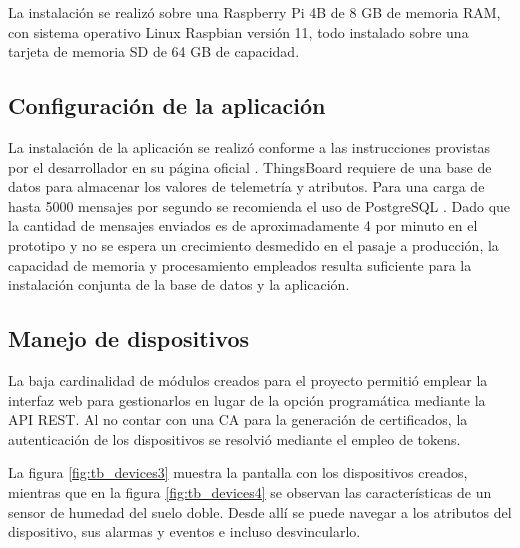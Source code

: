 La instalación se realizó sobre una Raspberry Pi 4B de 8 GB de memoria RAM, con sistema operativo Linux Raspbian versión 11, todo instalado sobre una tarjeta de memoria SD de 64 GB de capacidad.



\subsection{Configuración de la aplicación}
\label{sec:Configuración de la aplicación}

La instalación de la aplicación se realizó conforme a las instrucciones provistas por el desarrollador en su página oficial \citep{tb_install}.
ThingsBoard requiere de una base de datos para almacenar los valores de telemetría y atributos. Para una carga de hasta 5000 mensajes por segundo se recomienda el uso de PostgreSQL \citep{postgresql}. Dado que la cantidad de mensajes enviados es de aproximadamente 4 por minuto en el prototipo y no se espera un crecimiento desmedido en el pasaje a producción, la capacidad de memoria y procesamiento empleados resulta suficiente para la instalación conjunta de la base de datos y la aplicación.



\pagebreak
\subsection{Manejo de dispositivos}
\label{sec:Manejo de dispositivos}

La baja cardinalidad de módulos creados para el proyecto permitió emplear la interfaz web para gestionarlos en lugar de la opción programática mediante la API REST.
Al no contar con una CA para la generación de certificados, la autenticación de los dispositivos se resolvió mediante el empleo de tokens.

La figura \ref{fig:tb_devices3} muestra la pantalla con los dispositivos creados, mientras que en la figura \ref{fig:tb_devices4} se observan las características de un sensor de humedad del suelo doble. Desde allí se puede navegar a los atributos del dispositivo, sus alarmas y eventos e incluso desvincularlo.







